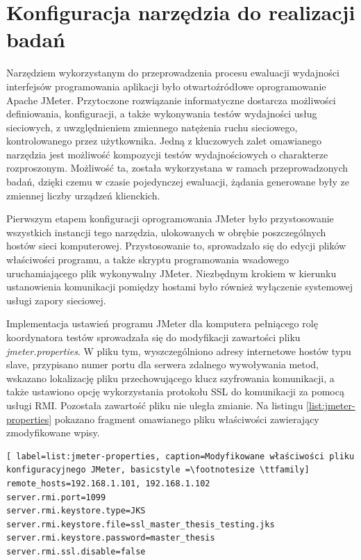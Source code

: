 \section{Konfiguracja narzędzia do realizacji badań}
Narzędziem wykorzystanym do przeprowadzenia procesu ewaluacji wydajności interfejsów programowania aplikacji było otwartoźródłowe oprogramowanie Apache JMeter. Przytoczone rozwiązanie informatyczne dostarcza możliwości definiowania, konfiguracji, a także wykonywania testów wydajności usług sieciowych, z uwzględnieniem zmiennego natężenia ruchu sieciowego, kontrolowanego przez użytkownika. Jedną z kluczowych zalet omawianego narzędzia jest możliwość kompozycji testów wydajnościowych o charakterze rozproszonym. Możliwość ta, została wykorzystana w ramach przeprowadzonych badań, dzięki czemu w czasie pojedynczej ewaluacji, żądania generowane były ze zmiennej liczby urządzeń klienckich.

Pierwszym etapem konfiguracji oprogramowania JMeter było przystosowanie wszystkich instancji tego narzędzia, ulokowanych w obrębie poszczególnych hostów sieci komputerowej. Przystosowanie to, sprowadzało się do edycji plików właściwości programu, a także skryptu programowania wsadowego uruchamiającego plik wykonywalny JMeter. Niezbędnym krokiem w kierunku ustanowienia komunikacji pomiędzy hostami było również wyłączenie systemowej usługi zapory sieciowej.

Implementacja ustawień programu JMeter dla komputera pełniącego rolę koordynatora testów sprowadzała się do modyfikacji zawartości pliku \textit{jmeter.properties}. W pliku tym, wyszczególniono adresy internetowe hostów typu slave, przypisano numer portu dla serwera zdalnego wywoływania metod, wskazano lokalizację pliku przechowującego klucz szyfrowania komunikacji, a także ustawiono opcję wykorzystania protokołu SSL do komunikacji za pomocą usługi RMI. Pozostała zawartość pliku nie uległa zmianie. Na listingu \ref{list:jmeter-properties} pokazano fragment omawianego pliku właściwości zawierający zmodyfikowane wpisy.

\begin{lstlisting}[ label=list:jmeter-properties, caption=Modyfikowane właściwości pliku konfiguracyjnego JMeter, basicstyle =\footnotesize \ttfamily]
remote_hosts=192.168.1.101, 192.168.1.102
server.rmi.port=1099
server.rmi.keystore.type=JKS
server.rmi.keystore.file=ssl_master_thesis_testing.jks
server.rmi.keystore.password=master_thesis
server.rmi.ssl.disable=false
\end{lstlisting}

